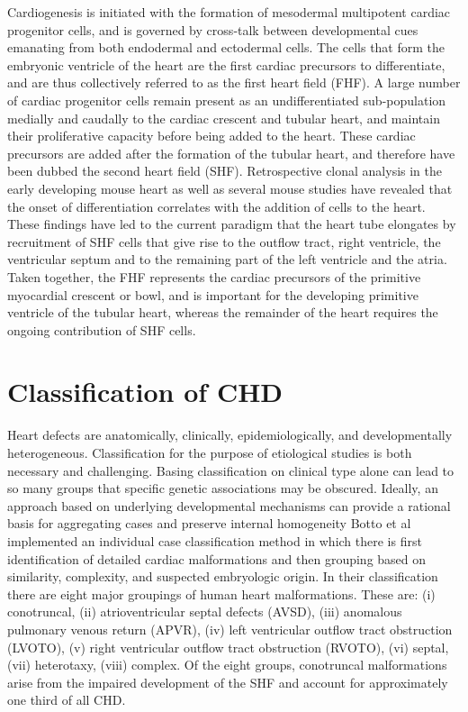 \begin{refsection}
Cardiogenesis is initiated with the formation of mesodermal multipotent cardiac progenitor cells, and is governed by cross‐talk between developmental cues emanating from both endodermal and ectodermal cells. The cells that form the embryonic ventricle of the heart are the first cardiac precursors to differentiate, and are thus collectively referred to as the first heart field (FHF). A large number of cardiac progenitor cells remain present as an undifferentiated sub-population medially and caudally to the cardiac crescent and tubular heart, and maintain their proliferative capacity before being added to the heart. These cardiac precursors are added after the formation of the tubular heart, and therefore have been dubbed the second heart field (SHF). Retrospective clonal analysis in the early developing mouse heart as well as several mouse studies have revealed that the onset of differentiation correlates with the addition of cells to the heart. These findings have led to the current paradigm that the heart tube elongates by recruitment of SHF cells that give rise to the outflow tract, right ventricle, the ventricular septum and to the remaining part of the left ventricle and the atria. Taken together, the FHF represents the cardiac precursors of the primitive myocardial crescent or bowl, and is important for the developing primitive ventricle of the tubular heart, whereas the remainder of the heart requires the ongoing contribution of SHF cells.

\section{Classification of CHD}

Heart defects are anatomically, clinically, epidemiologically, and developmentally heterogeneous. Classification for the purpose of etiological studies is both necessary and challenging. Basing classification on clinical type alone can lead to so many groups that specific genetic associations may be obscured. Ideally, an approach based on underlying developmental mechanisms can provide a rational basis for aggregating cases and preserve internal homogeneity Botto et al \cite{botto2007seeking} implemented an individual case classification method in which there is first identification of detailed cardiac malformations and then grouping based on similarity, complexity, and suspected embryologic origin. In their classification there are eight major groupings of human heart malformations. These are: (i) conotruncal, (ii) atrioventricular septal defects (AVSD), (iii) anomalous pulmonary venous return (APVR), (iv) left ventricular outflow tract obstruction (LVOTO), (v) right ventricular outflow tract obstruction (RVOTO), (vi) septal, (vii) heterotaxy, (viii) complex. Of the eight groups, conotruncal malformations arise from the impaired development of the SHF and account for approximately one third of all CHD.


\end{refsection}
